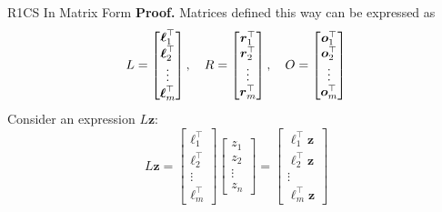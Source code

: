 \documentclass{zkdl-presentation-template}
\begin{document}
    \begin{frame}{R1CS In Matrix Form}
        \textbf{Proof.} Matrices defined this way can be expressed as
        \vspace{-5pt}
        {\scriptsize \begin{equation*}
            L = \begin{bmatrix}
                \boldsymbol{\ell}_1^{\top} \\ \boldsymbol{\ell}_2^{\top} \\ \vdots \\ \boldsymbol{\ell}_m^{\top}
            \end{bmatrix}, \quad R = \begin{bmatrix}
                \boldsymbol{r}_1^{\top} \\ \boldsymbol{r}_2^{\top} \\ \vdots \\ \boldsymbol{r}_m^{\top}
            \end{bmatrix}, \quad O = \begin{bmatrix}
                \boldsymbol{o}_1^{\top} \\ \boldsymbol{o}_2^{\top} \\ \vdots \\ \boldsymbol{o}_m^{\top}
            \end{bmatrix}
            \vspace{-5pt}
        \end{equation*}}
        \pause
        Consider an expression $L\mathbf{z}$:
        \vspace{-5pt}
        {\scriptsize \begin{equation*}
            L\mathbf{z} = \begin{bmatrix}
                \boldsymbol{\ell}_1^{\top} \\ \boldsymbol{\ell}_2^{\top} \\ \vdots \\ \boldsymbol{\ell}_m^{\top}
            \end{bmatrix}\begin{bmatrix}
                z_1 \\ z_2 \\ \vdots \\ z_n
            \end{bmatrix} = \begin{bmatrix}
                \boldsymbol{\ell}_1^{\top}\mathbf{z} \\ \boldsymbol{\ell}_2^{\top}\mathbf{z} \\ \vdots \\ \boldsymbol{\ell}_m^{\top}\mathbf{z}

\end{bmatrix}
\end{equation*}}
\end{frame}
\end{document}
